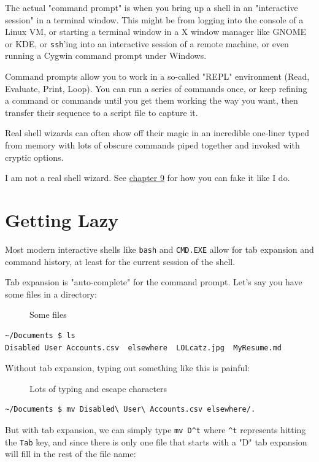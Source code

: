 \documentclass[10pt,]{book}
\numberwithin{figure}{chapter}
\DeclareRobustCommand{\drcap}[1]{\begin{figure}[H]\caption{#1}\end{figure}}
\DeclareRobustCommand{\drcmd}[1]{\index{Commands!#1}}
\begin{document}
The actual "command prompt" is when you bring up a shell in an
"interactive session" in a terminal window. This might be from logging
into the console of a Linux VM, or starting a terminal window in a X
window manager like GNOME or KDE, or \texttt{ssh}'ing\drcmd{ssh} into an
interactive session of a remote machine, or even running a Cygwin
command prompt under Windows.

Command prompts allow you to work in a so-called "REPL" environment
(Read, Evaluate, Print, Loop). You can run a series of commands once, or
keep refining a command or commands until you get them working the way
you want, then transfer their sequence to a script file to capture it.

Real shell wizards can often show off their magic in an incredible
one-liner typed from memory with lots of obscure commands piped together
and invoked with cryptic options.

I am not a real shell wizard. See
\hyperref[how-do-you-know-what-you-dont-know-man]{chapter 9} for how you
can fake it like I do.

\section*{Getting Lazy}\label{getting-lazy}

Most modern interactive shells like \texttt{bash} and \texttt{CMD.EXE}
allow for tab expansion and command history, at least for the current
session of the shell.

Tab expansion is "auto-complete" for the command prompt. Let's say you
have some files in a directory:

\drcap{Some files}

\begin{verbatim}
~/Documents $ ls
Disabled User Accounts.csv  elsewhere  LOLcatz.jpg  MyResume.md
\end{verbatim}

Without tab expansion, typing out something like this is painful:

\drcap{Lots of typing and escape characters}

\begin{verbatim}
~/Documents $ mv Disabled\ User\ Accounts.csv elsewhere/.
\end{verbatim}

But with tab expansion, we can simply type \texttt{mv D\^{}t} where
\texttt{\^{}t} represents hitting the \texttt{Tab} key, and since there
is only one file that starts with a "D" tab expansion will fill in the
rest of the file name:
\end{document}
